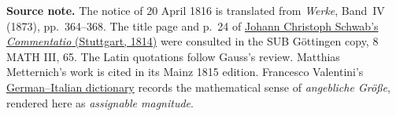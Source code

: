 \par\medskip\begin{small}\noindent\textbf{Source note.} The notice of 20 April 1816 is translated from \textit{Werke}, Band~IV (1873), pp.~364--368. The title page and p.~24 of \href{https://gdz.sub.uni-goettingen.de/id/PPN603351808}{Johann Christoph Schwab's \textit{Commentatio} (Stuttgart, 1814)} were consulted in the SUB Göttingen copy, 8 MATH III, 65. The Latin quotations follow Gauss's review. Matthias Metternich's work is cited in its Mainz 1815 edition. Francesco Valentini's \href{https://doi.org/10.3931/e-rara-91963}{German--Italian dictionary} records the mathematical sense of \textit{angebliche Größe}, rendered here as \textit{assignable magnitude}.\par\end{small}

